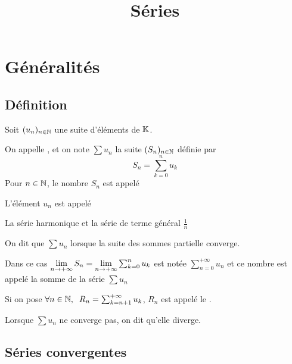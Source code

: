 

\title{Séries}



\maketitle
\pagebreak
\tableofcontents

\section{Généralités}

\subsection{Définition}

\begin{dfn}
Soit $(u_n)_{n \in \mathbb{N}}$ une suite d'éléments de $\mathbb{K}$.

On appelle , et on note $\sum u_n$
la suite $(S_n)_{n \in \mathbb{N}}$ définie par
\[
    S_n = \sum^n_{k = 0} u_k
\]
Pour $n \in \mathbb{N}$, le nombre $S_n$ est appelé 

L'élément $u_n$ est appelé 
\end{dfn}

\begin{dfn}
La série harmonique et la série de terme général $\frac{1}{n}$
\end{dfn}

\begin{dfn}
On dit que $\sum u_n$  lorsque la suite des sommes partielle
converge.

Dans ce cas $\lim\limits_{n \to +\infty} S_n = \lim\limits_{n \to +\infty} \sum^n_{k = 0} u_k$ est notée
$\sum^{+ \infty}_{n = 0} u_n$ et ce nombre est appelé la somme de la
série $\sum u_n$

Si on pose $\forall n \in \mathbb{N}, \;\; R_n = \sum^{+\infty}_{k = n + 1} u_k$,
$R_n$ est appelé le .

Lorsque $\sum u_n$ ne converge pas, on dit qu'elle diverge.
\end{dfn}

\subsection{Séries convergentes}

